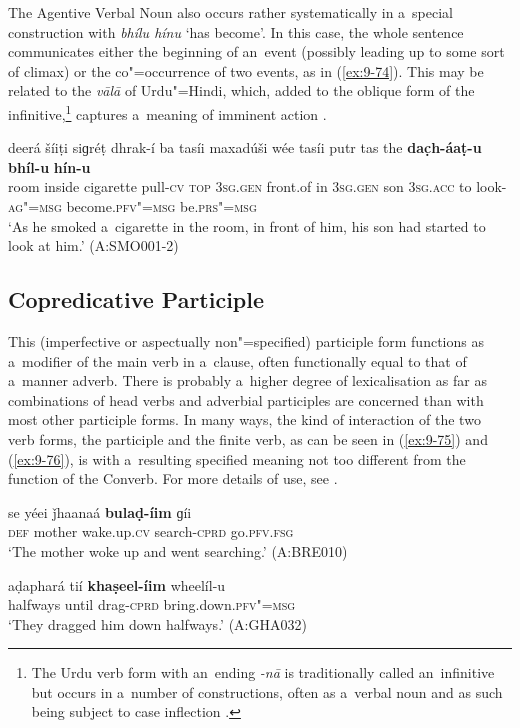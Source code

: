 The Agentive Verbal Noun also occurs rather systematically in a~special construction with \textit{bhílu hínu} `has become'. In this case, the whole sentence communicates either the beginning of an~event (possibly leading up to some sort of climax) or the co"=occurrence of two events, as in (\ref{ex:9-74}). This may be related to the \textit{vālā} of Urdu"=Hindi, which, added to the oblique form of the infinitive,\footnote{The Urdu verb form with an~ending \textit{-nā} is traditionally called an~infinitive but occurs in a~number of constructions, often as a~verbal noun and as such being subject to case inflection \citep[132--142]{schmidt1999}.} captures a~meaning of imminent action \citep[139]{schmidt1999}. 


\begin{exe}
\ex
\label{ex:9-74}
\gll deerá šíiṭi siɡréṭ dhrak-í ba tasíi maxadúši wée tasíi putr tas the \textbf{dac̣h-áaṭ-u} \textbf{bhíl-u} \textbf{hín-u} \\
room inside cigarette pull-\textsc{cv} \textsc{top} \textsc{3sg.gen} front.of in \textsc{3sg.gen} son \textsc{3sg.acc} to look-\textsc{ag"=msg} become.\textsc{pfv"=msg} be.\textsc{prs"=msg } \\
\glt `As he smoked a~cigarette in the room, in front of him, his son had started to look at him.' (A:SMO001-2)
\end{exe}

\subsection{Copredicative Participle}
\label{subsec:9-3-5}

This (imperfective or aspectually non"=specified) participle form functions as a~modifier of the main verb in a~clause, often functionally equal to that of a~manner adverb. There is probably a~higher degree of lexicalisation as far as combinations of head verbs and adverbial participles are concerned than with most other participle forms. In many ways, the kind of interaction of the two verb forms, the participle and the finite verb, as can be seen in (\ref{ex:9-75}) and (\ref{ex:9-76}), is with a~resulting specified meaning not too different from the function of the Converb. For more details of use, see . 

\begin{exe}
\ex
\label{ex:9-75}
\gll se yéei ǰhaanaá \textbf{bulaḍ-íim} ɡíi\\
\textsc{def} mother wake.up.\textsc{cv} search-\textsc{cprd} go.\textsc{pfv.fsg} \\
\glt `The mother woke up and went searching.' (A:BRE010)

\ex
\label{ex:9-76}
\gll aḍaphará tií \textbf{khaṣeel-íim} wheelíl-u\\
halfways until drag-\textsc{cprd} bring.down.\textsc{pfv"=msg} \\
\glt `They dragged him down halfways.' (A:GHA032)
\end{exe}

